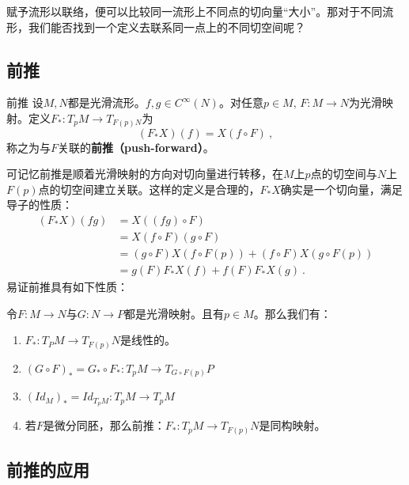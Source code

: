 
\begin{issues}
\end{issues}

赋予流形以联络，便可以比较同一流形上不同点的切向量“大小”。那对于不同流形，我们能否找到一个定义去联系同一点上的不同切空间呢？
\subsection{前推}
\begin{definition}{前推}
设$M,N$都是光滑流形。$f,g\in C^{\infty}(N)$。对任意$p\in M,\,F:M\rightarrow N$为光滑映射。定义$F_*:T_p M\rightarrow T_{F(p)N}$为
\begin{equation}
(F_*X)(f)=X(f\circ F)~,
\end{equation}
称之为与$F$关联的\textbf{前推（push-forward）}。
\end{definition}
可记忆前推是顺着光滑映射的方向对切向量进行转移，在$M$上$p$点的切空间与$N$上$F(p)$点的切空间建立关联。这样的定义是合理的，$F_*X$确实是一个切向量，满足导子的性质：
\begin{equation}
\begin{aligned}
(F_*X)(fg)&=X((fg)\circ F)\\
&=X(f\circ F)(g\circ F)\\
&=(g\circ F)X(f\circ F(p))+(f\circ F)X(g\circ F(p))\\
&=g(F)F_*X(f)+f(F)F_*X(g)~.
\end{aligned}
\end{equation}
易证前推具有如下性质：
\begin{lemma}{}
令$F:M\rightarrow N$与$G:N\rightarrow P$都是光滑映射。且有$p\in M$。那么我们有：
\begin{enumerate}
\item $F_*:T_P M\rightarrow T_{F(p)}N$是线性的。
\item $(G\circ F)_*=G_*\circ F_*:T_p M\rightarrow T_{G\circ F(p)}P$
\item $(Id_M)_*=Id_{T_p M}:T_p M\rightarrow T_p M$
\item 若$F$是微分同胚，那么前推：$F_*: T_p M\rightarrow T_{F(p)}N$是同构映射。
\end{enumerate}
\end{lemma}


\subsection{前推的应用}
